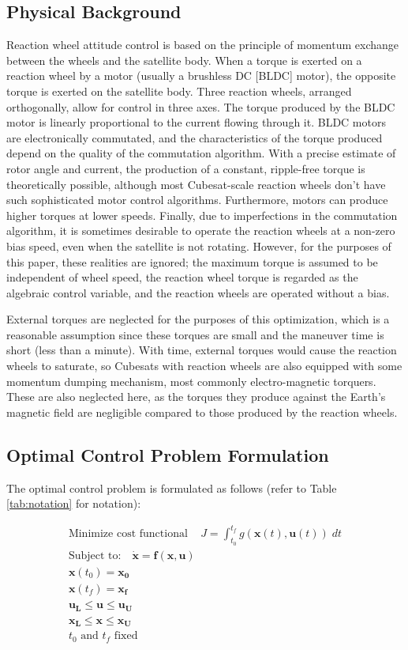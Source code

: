 \documentclass[letterpaper, paper,11pt]{AAS}
\begin{document}
\subsection{Physical Background}
Reaction wheel attitude control is based on the principle of momentum exchange between the wheels and the satellite body. When a torque is exerted on a reaction wheel by a motor (usually a brushless DC [BLDC] motor), the opposite torque is exerted on the satellite body. Three reaction wheels, arranged orthogonally, allow for control in three axes. The torque produced by the BLDC motor is linearly proportional to the current flowing through it. BLDC motors are electronically commutated, and the characteristics of the torque produced depend on the quality of the commutation algorithm. With a precise estimate of rotor angle and current, the production of a constant, ripple-free torque is theoretically possible, although most Cubesat-scale reaction wheels don't have such sophisticated motor control algorithms. Furthermore, motors can produce higher torques at lower speeds. Finally, due to imperfections in the commutation algorithm, it is sometimes desirable to operate the reaction wheels at a non-zero bias speed, even when the satellite is not rotating. However, for the purposes of this paper, these realities are ignored; the maximum torque is assumed to be independent of wheel speed, the reaction wheel torque is regarded as the algebraic control variable, and the reaction wheels are operated without a bias. 

External torques are neglected for the purposes of this optimization, which is a reasonable assumption since these torques are small and the maneuver time is short (less than a minute). With time, external torques would cause the reaction wheels to saturate, so Cubesats with reaction wheels are also equipped with some momentum dumping mechanism, most commonly electro-magnetic torquers. These are also neglected here, as the torques they produce against the Earth's magnetic field are negligible compared to those produced by the reaction wheels. 



\subsection{Optimal Control Problem Formulation}

The optimal control problem is formulated as follows (refer to Table \ref{tab:notation} for notation):

\begin{align*}
	\text{Minimize cost functional } \;\;\; J = \int_{t_0}^{t_f} g(\pmb{x}(t),\pmb{u}(t)) \; dt \\ 
	\text{Subject to}: \;\;\; \mathbf{\dot{x}} = \textbf{f}(\textbf{x},\textbf{u}) \\
	\mathbf{x}(t_{0}) = \mathbf{x_{0}}\\
	\mathbf{x}(t_{f}) = \mathbf{x_{f}}\\
	\mathbf{u_{L}} \leq \mathbf{u} \leq \mathbf{u_{U}} 	\\
	\mathbf{x_{L}} \leq \mathbf{x} \leq \mathbf{x_{U}} \\
	t_{0}\text{ and } t_{f} \text{ fixed}
\end{align*}
\end{document}

